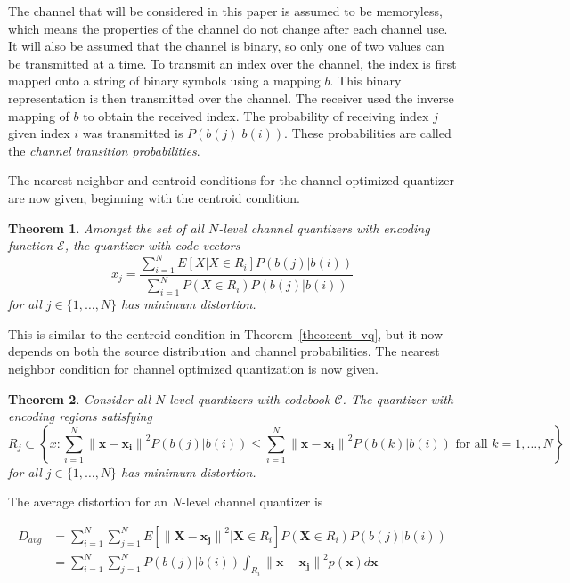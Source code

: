 \documentclass[10pt]{article}
\newtheorem{theorem}{Theorem}[section]
\begin{document}
The channel that will be considered in this paper is assumed to be memoryless, which means the properties of the channel do not change after each channel use. It will also be assumed that the channel is binary, so only one of two values can be transmitted at a time. To transmit an index over the channel, the index is first mapped onto a string of binary symbols using a mapping $b$. This binary representation is then transmitted over the channel. The receiver used the inverse mapping of $b$ to obtain the received index. The probability of receiving index $j$ given index $i$ was transmitted is $P(b(j)|b(i))$. These probabilities are called the \emph{channel transition probabilities}.

The nearest neighbor and centroid conditions for the channel optimized quantizer are now given, beginning with the centroid condition.

\begin{theorem}
\label{theo:cent_covq}
Amongst the set of all $N$-level channel quantizers with encoding function $\mathcal{E}$, the quantizer with code vectors
\begin{equation}
  \label{eq:cent_covq}
  x_j = \frac{\sum_{i=1}^N E[X | X \in R_i]P(b(j)|b(i))}{\sum_{i=1}^N P( X \in R_i)P(b(j)|b(i))} 
\end{equation}
for all $j \in \{1,\ldots,N\}$ has minimum distortion.
\end{theorem}
This is similar to the centroid condition in Theorem~\ref{theo:cent_vq}, but it now depends on both the source distribution and channel probabilities. The nearest neighbor condition for channel optimized quantization is now given.

\begin{theorem}
Consider all $N$-level quantizers with codebook $\mathcal{C}$. The quantizer with encoding regions satisfying
\begin{equation}
R_j \subset \left\{x : \sum_{i=1}^N {\| \mathbf{x} - \mathbf{x_i} \|}^2P(b(j)|b(i)) \le \sum_{i=1}^N {\| \mathbf{x} - \mathbf{x_i} \|}^2P(b(k)|b(i)) \text{ for all } k = 1,\ldots,N \right\}
\end{equation}
for all $j \in \{1,\ldots,N\}$ has minimum distortion.
\end{theorem}

The average distortion for an $N$-level channel quantizer is

\begin{align}
D_{avg} &= \sum_{i=1}^{N} \sum_{j=1}^{N} E[ {\|\mathbf{X} - \mathbf{x_j}\|}^2 | \mathbf{X} \in R_i] P(\mathbf{X} \in R_i) P(b(j)|b(i))\\
&= \sum_{i=1}^{N} \sum_{j=1}^{N} P(b(j)|b(i)) \int_{R_i} {\|\mathbf{x} - \mathbf{x_j}\|}^2 p(\mathbf{x}) d\mathbf{x}
\end{align}
\end{document}
